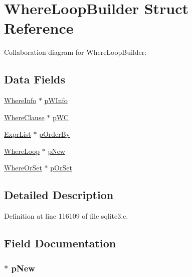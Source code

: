 \hypertarget{struct_where_loop_builder}{}\section{Where\+Loop\+Builder Struct Reference}
\label{struct_where_loop_builder}


Collaboration diagram for Where\+Loop\+Builder\+:
\subsection*{Data Fields}
\begin{DoxyCompactItemize}
\item 
\hyperlink{struct_where_info}{Where\+Info} $\ast$ \hyperlink{struct_where_loop_builder_a831ff4750d43c35052a460caacac1bac}{p\+W\+Info}
\item 
\hyperlink{struct_where_clause}{Where\+Clause} $\ast$ \hyperlink{struct_where_loop_builder_ab85657232a3c235326f1e0dd179e32b7}{p\+W\+C}
\item 
\hyperlink{struct_expr_list}{Expr\+List} $\ast$ \hyperlink{struct_where_loop_builder_a9150e506e5902e336130c9764caf96a0}{p\+Order\+By}
\item 
\hyperlink{struct_where_loop}{Where\+Loop} $\ast$ \hyperlink{struct_where_loop_builder_aec515549cef84f0573acb48874748144}{p\+New}
\item 
\hyperlink{struct_where_or_set}{Where\+Or\+Set} $\ast$ \hyperlink{struct_where_loop_builder_ad2fa0e4c27168f8c6fdcf8a94a04bd41}{p\+Or\+Set}
\end{DoxyCompactItemize}


\subsection{Detailed Description}


Definition at line 116109 of file sqlite3.\+c.



\subsection{Field Documentation}
\hypertarget{struct_where_loop_builder_aec515549cef84f0573acb48874748144}{}
\subsubsection[{p\+New}]{$\ast$ p\+New}\label{struct_where_loop_builder_aec515549cef84f0573acb48874748144}


